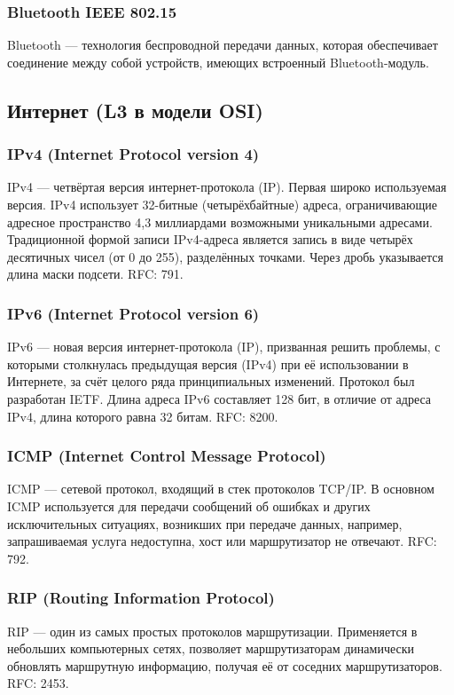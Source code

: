 \subsubsection{Bluetooth IEEE 802.15}
Bluetooth — технология беспроводной передачи данных, которая обеспечивает соединение
между собой устройств, имеющих встроенный Bluetooth-модуль.

\subsection{Интернет (L3 в модели OSI)}

\subsubsection{IPv4 (Internet Protocol version 4)}
IPv4 — четвёртая версия интернет-протокола (IP). Первая широко используемая версия.
IPv4 использует 32-битные (четырёхбайтные) адреса, ограничивающие адресное пространство
4{,}3 миллиардами возможными уникальными адресами.
Традиционной формой записи IPv4-адреса является запись в виде четырёх десятичных
чисел (от 0 до 255), разделённых точками. Через дробь указывается длина маски подсети.
RFC: 791.

\subsubsection{IPv6 (Internet Protocol version 6)}
IPv6 — новая версия интернет-протокола (IP), призванная решить проблемы, с которыми
столкнулась предыдущая версия (IPv4) при её использовании в Интернете, за счёт целого ряда
принципиальных изменений. Протокол был разработан IETF. Длина адреса IPv6 составляет 128
бит, в отличие от адреса IPv4, длина которого равна 32 битам. RFC: 8200.

\subsubsection{ICMP (Internet Control Message Protocol)}
ICMP — сетевой протокол, входящий в стек протоколов TCP/IP. В основном ICMP
используется для передачи сообщений об ошибках и других исключительных ситуациях,
возникших при передаче данных, например, запрашиваемая услуга недоступна, хост или
маршрутизатор не отвечают. RFC: 792.

\subsubsection{RIP (Routing Information Protocol)}
RIP — один из самых простых протоколов маршрутизации. Применяется в небольших
компьютерных сетях, позволяет маршрутизаторам динамически обновлять маршрутную
информацию, получая её от соседних маршрутизаторов. RFC: 2453.

